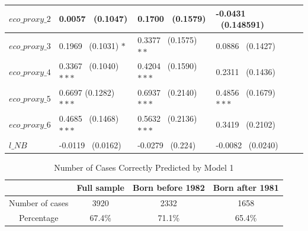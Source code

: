 \documentclass[12pt]{article}
\begin{document}
\begin{table} [ht]
\begin{center}
\begin{tabular}{l|l|l|l p{}}
\hline
$eco\_{proxy}\_{2}$&0.0057 \ (0.1047)&0.1700 \ (0.1579)&-0.0431 \ (0.148591)\\
\hline
$eco\_{proxy}\_{3}$&0.1969 \ (0.1031) $\ast$&0.3377 \ (0.1575) $\ast\ast$&0.0886 \ (0.1427)\\
\hline
$eco\_{proxy}\_{4}$&0.3367 \ (0.1040) $\ast\ast\ast$&0.4204 \ (0.1590) $\ast\ast\ast$&0.2311 \ (0.1436)\\
\hline
$eco\_{proxy}\_{5}$&0.6697 (0.1282) $\ast\ast\ast$&0.6937 \ (0.2140) $\ast\ast\ast$&0.4856 \ (0.1679) $\ast\ast\ast$\\
\hline
$eco\_{proxy}\_{6}$&0.4685 \ (0.1468) $\ast\ast\ast$&0.5632 \ (0.2136) $\ast\ast\ast$&0.3419 \ (0.2102)\\
\hline
$l\_{NB}$&-0.0119 \ (0.0162)&-0.0279 \ (0.224)&-0.0082 \ (0.0240)\\
\hline

\end{tabular}
\end{center}
  \label{models}
\end{table}

\begin{table} [ht]
\caption{Number of Cases Correctly Predicted by Model 1}
\begin{center}
\begin{tabular}{cccc}
&Full sample&Born before 1982&Born after 1981\\
\hline
\hline
Number of cases&3920&2332&1658\\
Percentage&67.4\%&71.1\%&65.4\%\\
\end{tabular}
\end{center}
\label{predicted}
\end{table}
\end{document}
